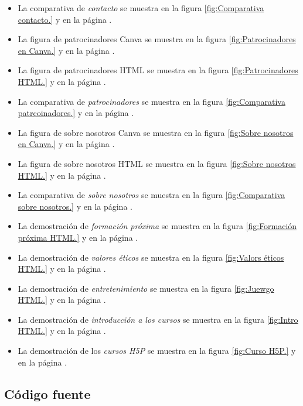 \documentclass[11.5pt]{article}
\begin{document}
\begin{itemize}
		\item La comparativa de \textit{contacto} se muestra en la figura \ref{fig:Comparativa contacto.} y en la página \pageref {fig:Comparativa contacto.}.
		\item La figura de patrocinadores Canva se muestra en la figura \ref{fig:Patrocinadores en Canva.} y en la página \pageref{fig:Patrocinadores en Canva.}.
		\item La figura de patrocinadores HTML se muestra en la figura \ref{fig:Patrocinadores HTML.} y en la página \pageref{fig:Patrocinadores HTML.}.
		\item La comparativa de \textit{patrocinadores} se muestra en la figura \ref{fig:Comparativa patrcoinadores.} y en la página \pageref {fig:Comparativa patrcoinadores.}.
		\item La figura de sobre nosotros Canva se muestra en la figura \ref{fig:Sobre nosotros en Canva.} y en la página \pageref{fig:Sobre nosotros en Canva.}.
		\item La figura de sobre nosotros HTML se muestra en la figura \ref{fig:Sobre nosotros HTML.} y en la página \pageref{fig:Sobre nosotros HTML.}.
		\item La comparativa de \textit{sobre nosotros} se muestra en la figura \ref{fig:Comparativa sobre nosotros.} y en la página \pageref {fig:Comparativa sobre nosotros.}.
		\item La demostración de \textit{formación próxima} se muestra en la figura \ref{fig:Formación próxima HTML.} y en la página \pageref {fig:Formación próxima HTML.}.
		\item La demostración de \textit{valores éticos} se muestra en la figura \ref{fig:Valors éticos HTML.} y en la página \pageref {fig:Valors éticos HTML.}.
		\item La demostración de \textit{entretenimiento} se muestra en la figura \ref{fig:Juewgo HTML.} y en la página \pageref {fig:Juewgo HTML.}.
		\item La demostración de \textit{introducción a los cursos} se muestra en la figura \ref{fig:Intro HTML.} y en la página \pageref {fig:Intro HTML.}.
		\item La demostración de los \textit{cursos H5P} se muestra en la figura \ref{fig:Curso H5P.} y en la página \pageref {fig:Curso H5P.}.
	\end{itemize}
	
	\subsection{Código fuente}
	
\end{document}
